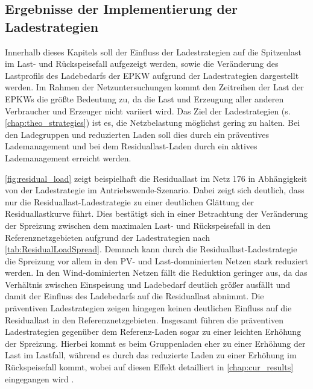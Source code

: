 


\subsection{Ergebnisse der Implementierung der Ladestrategien}\label{chap:results_charging_strategies}

Innerhalb dieses Kapitels soll der Einfluss der Ladestrategien auf die Spitzenlast im Last- und Rückspeisefall aufgezeigt werden, sowie die Veränderung des Lastprofils des Ladebedarfs der \gls{EPKW} aufgrund der Ladestrategien dargestellt werden.
Im Rahmen der Netzuntersuchungen kommt den Zeitreihen der Last der \glspl{EPKW} die größte Bedeutung zu, da die Last und Erzeugung aller anderen Verbraucher und Erzeuger nicht variiert wird.
Das Ziel der Ladestrategien (s. \autoref{chap:theo_strategies}) ist es, die Netzbelastung möglichst gering zu halten.
Bei den Ladegruppen und reduzierten Laden soll dies durch ein präventives Lademanagement und bei dem Residuallast-Laden durch ein aktives Lademanagement erreicht werden.



\autoref{fig:residual_load} zeigt beispielhaft die Residuallast im Netz \num{176} in Abhängigkeit von der Ladestrategie im Antriebswende-Szenario.
Dabei zeigt sich deutlich, dass nur die Residuallast-Ladestrategie zu einer deutlichen Glättung der Residuallastkurve führt.
Dies bestätigt sich in einer Betrachtung der Veränderung der Spreizung zwischen dem maximalen Last- und Rückspeisefall in den Referenznetzgebieten aufgrund der Ladestrategien nach \autoref{tab:ResidualLoadSpread}.
Demnach kann durch die Residuallast-Ladestrategie die Spreizung vor allem in den \gls{PV}- und Last-domninierten Netzen stark reduziert werden.
In den Wind-dominierten Netzen fällt die Reduktion geringer aus, da das Verhältnis zwischen Einspeisung und Ladebedarf deutlich größer ausfällt und damit der Einfluss des Ladebedarfs auf die Residuallast abnimmt.
Die präventiven Ladestrategien zeigen hingegen keinen deutlichen Einfluss auf die Residuallast in den Referenznetzgebieten.
Insgesamt führen die präventiven Ladestrategien gegenüber dem Referenz-Laden sogar zu einer leichten Erhöhung der Spreizung.
Hierbei kommt es beim Gruppenladen eher zu einer Erhöhung der Last im Lastfall, während es durch das reduzierte Laden zu einer Erhöhung im Rückspeisefall kommt, wobei auf diesen Effekt detailliert in \autoref{chap:cur_results} eingegangen wird .

